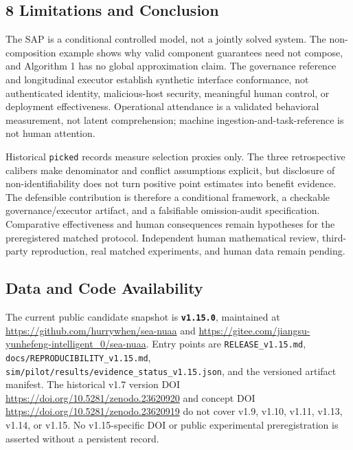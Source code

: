\documentclass[
  11pt]{article}
\begin{document}
\subsection{8 Limitations and
Conclusion}\label{limitations-and-conclusion}

The SAP is a conditional controlled model, not a jointly solved system.
The non-composition example shows why valid component guarantees need
not compose, and Algorithm 1 has no global approximation claim. The
governance reference and longitudinal executor establish synthetic
interface conformance, not authenticated identity, malicious-host
security, meaningful human control, or deployment effectiveness.
Operational attendance is a validated behavioral measurement, not latent
comprehension; machine ingestion-and-task-reference is not human
attention.

Historical \texttt{picked} records measure selection proxies only. The
three retrospective calibers make denominator and conflict assumptions
explicit, but disclosure of non-identifiability does not turn positive
point estimates into benefit evidence. The defensible contribution is
therefore a conditional framework, a checkable governance/executor
artifact, and a falsifiable omission-audit specification. Comparative
effectiveness and human consequences remain hypotheses for the
preregistered matched protocol. Independent human mathematical review,
third-party reproduction, real matched experiments, and human data
remain pending.

\subsection{Data and Code
Availability}\label{data-and-code-availability}

The current public candidate snapshot is \textbf{\texttt{v1.15.0}},
maintained at \url{https://github.com/hurrywhen/sea-nuaa} and
\url{https://gitee.com/jiangsu-yunhefeng-intelligent_0/sea-nuaa}. Entry
points are \texttt{RELEASE\_v1.15.md},
\texttt{docs/REPRODUCIBILITY\_v1.15.md},
\texttt{sim/pilot/results/evidence\_status\_v1.15.json}, and the
versioned artifact manifest. The historical v1.7 version DOI
\url{https://doi.org/10.5281/zenodo.23620920} and concept DOI
\url{https://doi.org/10.5281/zenodo.23620919} do not cover v1.9, v1.10,
v1.11, v1.13, v1.14, or v1.15. No v1.15-specific DOI or public
experimental preregistration is asserted without a persistent record.
\end{document}
